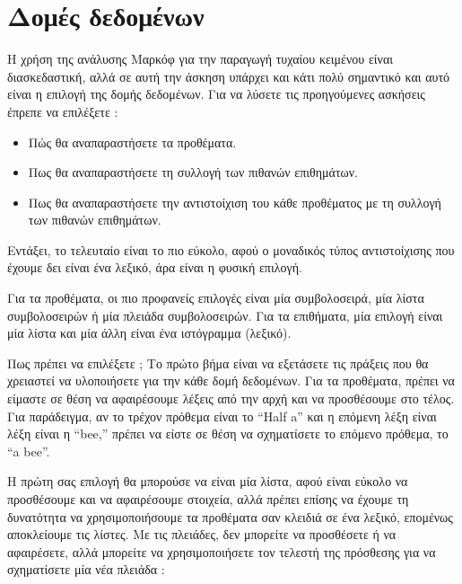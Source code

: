 \documentclass[10pt]{book}
\begin{document}
\section{Δομές δεδομένων}

Η χρήση της ανάλυσης Μαρκόφ για την παραγωγή τυχαίου κειμένου είναι διασκεδαστική, αλλά σε αυτή την άσκηση υπάρχει και κάτι 
πολύ σημαντικό και αυτό είναι η επιλογή της δομής δεδομένων. Για να λύσετε τις προηγούμενες ασκήσεις έπρεπε να επιλέξετε :

\begin{itemize}

\item  Πώς θα αναπαραστήσετε τα προθέματα. 

\item  Πως θα αναπαραστήσετε τη συλλογή των πιθανών επιθημάτων. 

\item  Πως θα αναπαραστήσετε την αντιστοίχιση του κάθε προθέματος με τη συλλογή των πιθανών επιθημάτων. 

\end{itemize}

 
Εντάξει, το τελευταίο είναι το πιο εύκολο, αφού ο μοναδικός τύπος αντιστοίχισης που έχουμε δει είναι ένα λεξικό, 
άρα είναι η φυσική επιλογή.

Για τα προθέματα, οι πιο προφανείς επιλογές είναι μία συμβολοσειρά, μία λίστα συμβολοσειρών ή μία πλειάδα συμβολοσειρών. 
Για τα επιθήματα, μία επιλογή είναι μία λίστα και μία άλλη είναι ένα ιστόγραμμα (λεξικό).

Πως πρέπει να επιλέξετε ;  Το πρώτο βήμα είναι να εξετάσετε τις πράξεις που θα χρειαστεί να υλοποιήσετε για την 
κάθε δομή δεδομένων. Για τα προθέματα, πρέπει να είμαστε σε θέση να αφαιρέσουμε λέξεις από την αρχή και να προσθέσουμε 
στο τέλος. Για παράδειγμα, αν το τρέχον πρόθεμα είναι το  ``Half a''  και η επόμενη λέξη είναι λέξη είναι η  
``bee,''  πρέπει να είστε σε θέση να σχηματίσετε το επόμενο πρόθεμα, το  ``a bee''.

 Η πρώτη σας επιλογή θα μπορούσε να είναι μία λίστα, αφού είναι εύκολο να προσθέσουμε και να αφαιρέσουμε στοιχεία, 
αλλά πρέπει επίσης να έχουμε τη δυνατότητα να χρησιμοποιήσουμε τα προθέματα σαν κλειδιά σε ένα λεξικό, επομένως αποκλείουμε 
τις λίστες. Με τις πλειάδες, δεν μπορείτε να προσθέσετε ή να αφαιρέσετε, αλλά μπορείτε να χρησιμοποιήσετε τον τελεστή της πρόσθεσης για να σχηματίσετε μία νέα πλειάδα :
\end{document}
